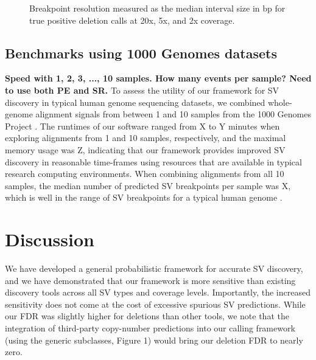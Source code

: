 \documentclass[11pt]{article}
\begin{document}
\begin{figure}
\caption{Breakpoint resolution measured as the median interval size in bp for
true positive deletion calls at 20x, 5x, and 2x coverage.}
\label{resolution:fig}
\end{figure}



\subsection{Benchmarks using 1000 Genomes datasets}
\textbf{Speed with 1, 2, 3, ..., 10 samples.  How many events per sample?
Need to use both PE and SR.}
To assess the utility of our framework for SV discovery in typical human genome
sequencing datasets, we combined whole-genome alignment signals from between 1 
and 10 samples from the 1000 Genomes Project \cite{durbin2010}. The runtimes
of our software ranged from X to Y minutes when exploring alignments from 1 and
10 samples, respectively, and the maximal memory usage was Z, indicating that
our framework provides improved SV discovery in reasonable time-frames using
resources that are available in typical research computing environments. When
combining alignments from all 10 samples, the median number of predicted SV
breakpoints per sample was X, which is well in the range of SV 
breakpoints for a typical human genome \cite{mills2011}.


\section{Discussion}
We have developed a general probabilistic framework for accurate SV discovery, 
and we have demonstrated that our framework is more sensitive than existing 
discovery tools across all SV types and coverage levels. Importantly, the
increased sensitivity does not come at the cost of excessive spurious SV
predictions. While our FDR was slightly higher for deletions than other tools,
we note that the integration of third-party copy-number predictions into
our calling framework (using the generic subclasses, Figure 1) would bring our 
deletion FDR to nearly zero.
\end{document}

